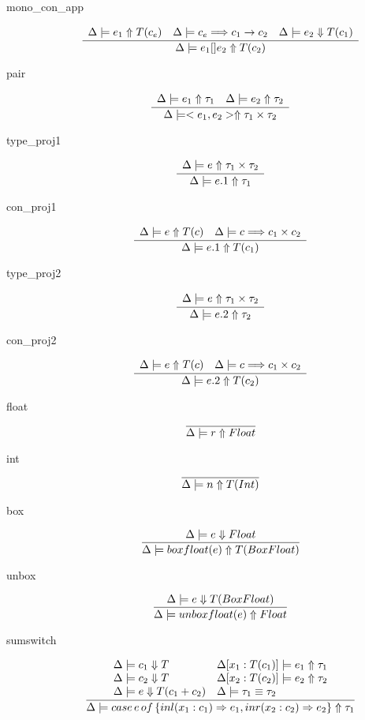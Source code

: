 \documentclass[12pt,twoside,fleqn]{amsart}
\theoremstyle{plain}
\theoremstyle{plain}
\theoremstyle{definition}
\begin{document}
\begin{description}
\item [mono\_con\_app]
\[
\frac{\begin{array}{lll}
\Delta  \models e_{1}  \Uparrow T(c_{e})  & \Delta  \models c_{e} \Longrightarrow c_{1}\rightarrow c_{2} & \Delta  \models e_{2} \Downarrow T(c_{1})
\end{array} }{\Delta  \models e_{1}[]e_{2}  \Uparrow T(c_{2})  }\]

\item [pair]
\[
\frac{\begin{array}{ll}
\Delta  \models e_{1}  \Uparrow \tau _{1}  & \Delta  \models e_{2}  \Uparrow \tau _{2} 
\end{array} }{\Delta  \models <e_{1},e_{2}>  \Uparrow \tau _{1}\times \tau _{2}  }\]

\item [type\_proj1]
\[
\frac{\begin{array}{ll}
\Delta  \models e  \Uparrow \tau _{1}\times \tau _{2} 
\end{array} }{\Delta  \models e.1  \Uparrow \tau _{1}  }\]

\item [con\_proj1]
\[
\frac{\begin{array}{ll}
\Delta  \models e  \Uparrow T(c)  & \Delta  \models c \Longrightarrow c_{1}\times c_{2}
\end{array} }{\Delta  \models e.1  \Uparrow T(c_{1})  }\]

\item [type\_proj2]
\[
\frac{\begin{array}{ll}
\Delta  \models e  \Uparrow \tau _{1}\times \tau _{2} 
\end{array} }{\Delta  \models e.2  \Uparrow \tau _{2}  }\]

\item [con\_proj2]
\[
\frac{\begin{array}{ll}
\Delta  \models e  \Uparrow T(c)  & \Delta  \models c \Longrightarrow c_{1}\times c_{2}
\end{array} }{\Delta  \models e.2  \Uparrow T(c_{2})  }\]

\item [float]
\[
\overline{\Delta  \models r  \Uparrow Float  }\]

\item [int]
\[
\overline{\Delta  \models n  \Uparrow T(Int)  }\]

\item [box]
\[
\frac{\Delta  \models e \Downarrow Float }{\Delta  \models boxfloat(e )  \Uparrow T(BoxFloat)  }\]

\item [unbox]
\[
\frac{\Delta  \models e \Downarrow T(BoxFloat) }{\Delta  \models unboxfloat(e )  \Uparrow Float  }\]

\item [sumswitch]
\[
\frac{\begin{array}{ll}
\Delta  \models c_{1} \Downarrow T & \Delta  [x_{1}  :T(c_{1})  ] \models e_{1} \Uparrow \tau _{1}\\
\Delta  \models c_{2} \Downarrow T & \Delta  [x_{2}  :T(c_{2})  ] \models e_{2} \Uparrow \tau _{2}\\
\Delta  \models e \Downarrow T(c_{1}+c_{2}) & \Delta  \models \tau _{1}  \equiv \tau _{2} 
\end{array} }{\Delta  \models case\, e \, of\, \{inl(x_{1} :c_{1} )\Rightarrow e_{1} ,inr(x_{2} :c_{2} )\Rightarrow e_{2} \}  \Uparrow \tau _{1}  }\]


\end{description}
\end{document}
